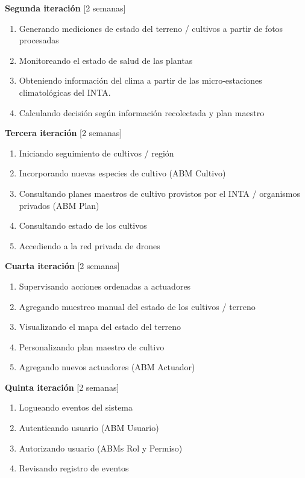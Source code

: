 \noindent \textbf{Segunda iteración} [2 semanas]
    \vspace{-5pt}
	\begin{enumerate} \itemsep -2pt
		\item Generando mediciones de estado del terreno / cultivos a partir de fotos procesadas
		\item Monitoreando el estado de salud de las plantas
		\item Obteniendo información del clima a partir de las micro-estaciones climatológicas del INTA.
		\item Calculando decisión según información recolectada y plan maestro
	\end{enumerate}

\noindent \textbf{Tercera iteración} [2 semanas]
    \vspace{-5pt}
	\begin{enumerate} \itemsep -2pt
		\item Iniciando seguimiento de cultivos / región
		\item Incorporando nuevas especies de cultivo (ABM Cultivo)
		\item Consultando planes maestros de cultivo provistos por el INTA / organismos privados (ABM Plan)
		\item Consultando estado de los cultivos
		\item Accediendo a la red privada de drones
	\end{enumerate}

\noindent \textbf{Cuarta iteración} [2 semanas]
    \vspace{-5pt}
	\begin{enumerate} \itemsep -2pt
		\item Supervisando acciones ordenadas a actuadores
		\item Agregando muestreo manual del estado de los cultivos / terreno
		\item Visualizando el mapa del estado del terreno
		\item Personalizando plan maestro de cultivo
		\item Agregando nuevos actuadores (ABM Actuador)
	\end{enumerate}

\noindent \textbf{Quinta iteración} [2 semanas]
    \vspace{-5pt}
	\begin{enumerate} \itemsep -2pt
		\item Logueando eventos del sistema
		\item Autenticando usuario (ABM Usuario)
		\item Autorizando usuario (ABMs Rol y Permiso)
		\item Revisando registro de eventos
	\end{enumerate}

